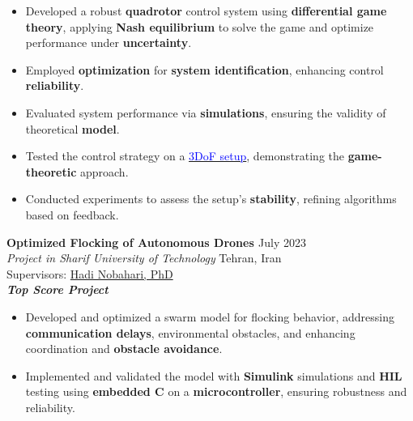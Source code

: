 \documentclass[12pt]{article}
\begin{document}
\begin{itemize} %
    \item Developed a robust \textbf{quadrotor} control system using \textbf{differential game theory}, applying \textbf{Nash equilibrium} to solve the game and optimize performance under \textbf{uncertainty}.
	 \item Employed \textbf{optimization} for \textbf{system identification}, enhancing control \textbf{reliability}.
    \item Evaluated system performance via \textbf{simulations}, ensuring the validity of theoretical \textbf{model}.
    \item Tested the control strategy on a \href{https://gcrc.sharif.edu/استند-آزمایشگاهی-کنترل-وضعیت-سه-درجه-آ/}{\textcolor{blue}{3DoF setup}}, demonstrating the \textbf{game-theoretic} approach.
    \item Conducted experiments to assess the setup's \textbf{stability}, refining algorithms based on feedback.
   
\end{itemize}


\vspace{0.2in}

\noindent
{\bfseries Optimized Flocking of Autonomous Drones
\href{https://github.com/alibaniasad1999/Guidance-and-navigation}{\faGithub}
} \hfill July 2023 \\ 
\noindent \textit{Project in Sharif University of Technology} \hfill Tehran, Iran \\ 
\noindent Supervisors: 
\href{https://ae.sharif.edu/~portal/faculty/1091235256}{Hadi Nobahari, PhD} 
\\
{\footnotesize \textbf{\textit{Top Score Project \faMedal}}}
\begin{itemize}%
    \item Developed and optimized a swarm model for flocking behavior, addressing \textbf{communication delays}, environmental obstacles, and enhancing coordination and \textbf{obstacle avoidance}.
    \item Implemented and validated the model with \textbf{Simulink} simulations and \textbf{HIL} testing using \textbf{embedded C} on a \textbf{microcontroller}, ensuring robustness and reliability.
\end{itemize}
\end{document}
